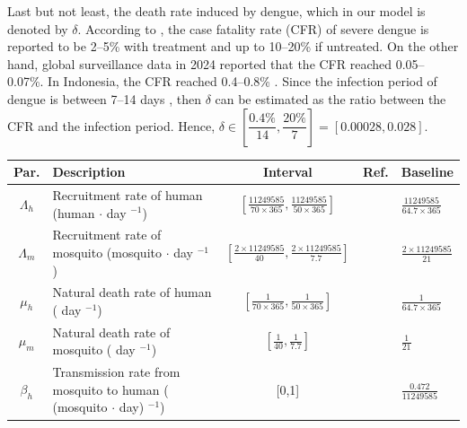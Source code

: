 \documentclass[preprint]{elsarticle}
\begin{document}
Last but not least, the death rate induced by dengue, which in our model is denoted by $\delta$. According to \cite{Schaefer2025DengueFever}, the case fatality rate (CFR) of severe dengue is reported to be 2–5\% with treatment and up to 10–20\% if untreated. On the other hand, global surveillance data in 2024 \cite{HAIDER2025107940} reported that the CFR reached 0.05–0.07\%. In Indonesia, the CFR reached 0.4–0.8\% \cite{KemenkesPusatKrisisDBD2026}. Since the infection period of dengue is between 7–14 days \cite{ALDILA2024115729}, then $\delta$ can be estimated as the ratio between the CFR and the infection period. Hence, $\delta \in \left[\dfrac{0.4\%}{14}, \dfrac{20\%}{7}\right] = [0.00028, 0.028]$.


\begin{landscape}
\begin{table}%
    \centering
    \begin{tabular}{cp{10cm}ccp{2cm}}
        \hline Par. & Description & Interval & Ref.&Baseline\\ \hline
         $\Lambda_h$ & Recruitment rate of human (human $\cdot$ day $^{-1}$) & $ \left[\frac{11249585}{70 \times 365}, \frac{11249585}{50 \times 365} \right]$  & \cite{ALDILA2024115729,asamoah2022optimal,muharram2024indonesia,WOODALL201467,XUE2021125742,Rashkov01012021,Ghosh2020TwoStrainDengue}& $\frac{11249585}{64.7 \times 365}$\\
         $\Lambda_m$ & Recruitment rate of mosquito (mosquito $\cdot$ day $^{-1}$)& $\left[ \frac{2 \times 11249585}{40}, \frac{2 \times 11249585}{7.7} \right]$ & \cite{ALDILA2024115729,WIJAYA201983,Aguiar2022DengueModels,WOODALL201467,XUE2021125742,Rashkov01012021,Ghosh2020TwoStrainDengue} & $\frac{2 \times 11249585}{21}$ \\
         $\mu_h$ & Natural death rate of human ( day $^{-1}$)& $\left[\frac{1}{70 \times 365},\frac{1}{50 \times 365}\right]$ & \cite{ALDILA2024115729,asamoah2022optimal,muharram2024indonesia,WOODALL201467,XUE2021125742,Rashkov01012021,Ghosh2020TwoStrainDengue} &$\frac{1}{64.7 \times 365}$ \\
         $\mu_m$ & Natural death rate of mosquito ( day $^{-1}$)& $\left[\frac{1}{40}, \frac{1}{7.7}\right]$ & \cite{ALDILA2024115729,WOODALL201467,XUE2021125742,Rashkov01012021,Ghosh2020TwoStrainDengue} & $\frac{1}{21}$ \\
         $\beta_h$ & Transmission rate from mosquito to human ( (mosquito $\cdot$ day) $^{-1}$)& [0,1] & \cite{ALDILA2024115729,WOODALL201467,Rashkov01012021} & $\frac{0.472}{11249585}$\\

\end{tabular}
\end{table}
\end{landscape}
\end{document}
